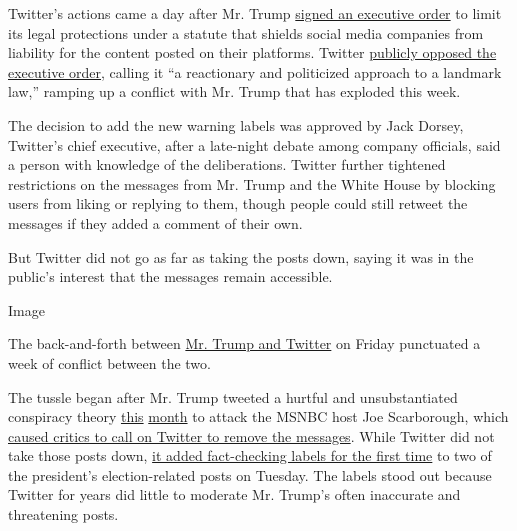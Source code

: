 Twitter's actions came a day after Mr. Trump
\href{https://www.nytimes.com/2020/05/28/us/politics/trump-jack-dorsey.html}{signed
an executive order} to limit its legal protections under a statute that
shields social media companies from liability for the content posted on
their platforms. Twitter
\href{https://twitter.com/Policy/status/1266170586197262337}{publicly
opposed the executive order}, calling it ``a reactionary and politicized
approach to a landmark law,'' ramping up a conflict with Mr. Trump that
has exploded this week.

The decision to add the new warning labels was approved by Jack Dorsey,
Twitter's chief executive, after a late-night debate among company
officials, said a person with knowledge of the deliberations. Twitter
further tightened restrictions on the messages from Mr. Trump and the
White House by blocking users from liking or replying to them, though
people could still retweet the messages if they added a comment of their
own.

But Twitter did not go as far as taking the posts down, saying it was in
the public's interest that the messages remain accessible.

Image

The back-and-forth between
\href{https://www.nytimes.com/2020/06/03/us/politics/trump-twitter-fact-check.html}{Mr.
Trump and Twitter} on Friday punctuated a week of conflict between the
two.

The tussle began after Mr. Trump tweeted a hurtful and unsubstantiated
conspiracy theory
\href{https://twitter.com/realDonaldTrump/status/1257258214615367680?ref_src=twsrc\%5Etfw\%7Ctwcamp\%5Etweetembed\%7Ctwterm\%5E1257258214615367680\%7Ctwgr\%5E\&ref_url=https\%3A\%2F\%2Fwww.nytimes.com\%2F2020\%2F05\%2F26\%2Fbusiness\%2Fletter-to-twitter-ceo.html}{this}
\href{https://twitter.com/realDonaldTrump/status/1260161295019630592?ref_src=twsrc\%5Etfw\%7Ctwcamp\%5Etweetembed\%7Ctwterm\%5E1260161295019630592\%7Ctwgr\%5E\&ref_url=https\%3A\%2F\%2Fwww.nytimes.com\%2F2020\%2F05\%2F26\%2Fbusiness\%2Fletter-to-twitter-ceo.html}{month}
to attack the MSNBC host Joe Scarborough, which
\href{https://www.nytimes.com/2020/05/26/opinion/trump-scarborough-twitter.html}{caused
critics to call on Twitter to remove the messages}. While Twitter did
not take those posts down,
\href{https://www.nytimes.com/2020/05/26/technology/twitter-trump-mail-in-ballots.html}{it
added fact-checking labels for the first time} to two of the president's
election-related posts on Tuesday. The labels stood out because Twitter
for years did little to moderate Mr. Trump's often inaccurate and
threatening posts.

